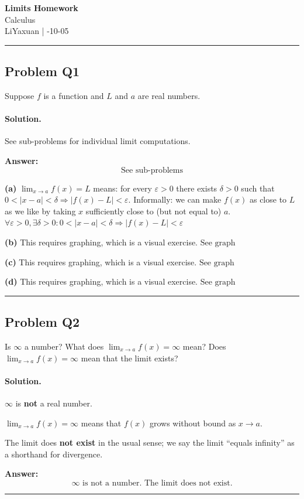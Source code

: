 \documentclass[12pt, a4paper]{article}
\newcommand{\problem}[1]{\subsection*{Problem #1}}
\newcommand{\solution}{\paragraph{Solution.}}
\begin{document}
\begin{center}
    {\LARGE\bfseries Limits Homework} \\[0.5em]
    {\large Calculus} \\[0.3em]
    LiYaxuan \quad | -10-05
\end{center}

\hrule
\vspace{1em}
\problem{Q1}

Suppose $f$ is a function and $L$ and $a$ are real numbers.

\solution

See sub-problems for individual limit computations.

\textbf{Answer:}
\[\boxed{\text{See sub-problems}}\]

\textbf{(a)}
$\lim_{x \to a} f(x) = L$ means: for every $\varepsilon > 0$ there exists $\delta > 0$ such that
$0 < |x - a| < \delta \Rightarrow |f(x) - L| < \varepsilon$.
Informally: we can make $f(x)$ as close to $L$ as we like by taking $x$ sufficiently close to (but not equal to) $a$.
$\boxed{\forall \varepsilon > 0, \exists \delta > 0: 0 < |x-a| < \delta \Rightarrow |f(x)-L| < \varepsilon}$

\textbf{(b)}
This requires graphing, which is a visual exercise.
$\boxed{\text{See graph}}$

\textbf{(c)}
This requires graphing, which is a visual exercise.
$\boxed{\text{See graph}}$

\textbf{(d)}
This requires graphing, which is a visual exercise.
$\boxed{\text{See graph}}$

\vspace{1em}
\hrule
\vspace{1em}

\problem{Q2}

Is $\infty$ a number? What does $\lim_{x \to a} f(x) = \infty$ mean? Does $\lim_{x \to a} f(x) = \infty$ mean that the limit exists?

\solution

$\infty$ is \textbf{not} a real number.

$\lim_{x \to a} f(x) = \infty$ means that $f(x)$ grows without bound as $x \to a$.

The limit does \textbf{not exist} in the usual sense; we say the limit ``equals infinity'' as a shorthand for divergence.

\textbf{Answer:}
\[\boxed{\infty \text{ is not a number. The limit does not exist.}}\]

\vspace{1em}
\hrule
\vspace{1em}
\end{document}
